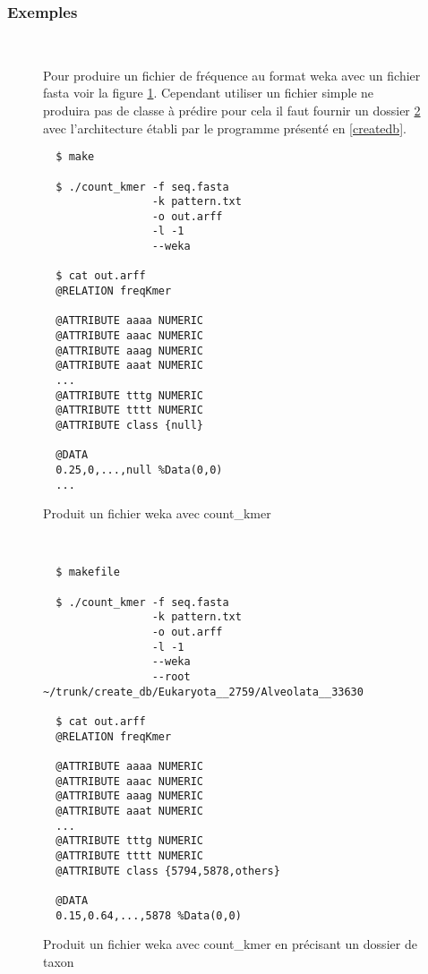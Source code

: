 \subsubsection{Exemples}


~\\
\begin{figure}[H]

Pour produire un fichier de fréquence au format weka avec un fichier fasta voir la figure \ref{freq1}.
Cependant utiliser un fichier simple ne produira pas de classe à prédire pour cela il faut fournir un dossier \ref{freq2}
avec l'architecture établi par le programme présenté en \ref{createdb}.
\begin{center}
\begin{verbatim}
  $ make
  
  $ ./count_kmer -f seq.fasta 
                 -k pattern.txt 
                 -o out.arff 
                 -l -1 
                 --weka
  
  $ cat out.arff
  @RELATION freqKmer

  @ATTRIBUTE aaaa NUMERIC
  @ATTRIBUTE aaac NUMERIC
  @ATTRIBUTE aaag NUMERIC
  @ATTRIBUTE aaat NUMERIC
  ...
  @ATTRIBUTE tttg NUMERIC
  @ATTRIBUTE tttt NUMERIC
  @ATTRIBUTE class {null}

  @DATA
  0.25,0,...,null %Data(0,0)
  ...

  \end{verbatim}
\end{center}
\caption{\label{freq1}Produit un fichier weka avec count\_kmer}
\end{figure}

~\\
\begin{figure}[H]
\begin{center}
\begin{verbatim}
  $ makefile
  
  $ ./count_kmer -f seq.fasta 
                 -k pattern.txt 
                 -o out.arff 
                 -l -1 
                 --weka 
                 --root ~/trunk/create_db/Eukaryota__2759/Alveolata__33630
  
  $ cat out.arff
  @RELATION freqKmer

  @ATTRIBUTE aaaa NUMERIC
  @ATTRIBUTE aaac NUMERIC
  @ATTRIBUTE aaag NUMERIC
  @ATTRIBUTE aaat NUMERIC
  ...
  @ATTRIBUTE tttg NUMERIC
  @ATTRIBUTE tttt NUMERIC
  @ATTRIBUTE class {5794,5878,others}

  @DATA
  0.15,0.64,...,5878 %Data(0,0)

  \end{verbatim}
\end{center}
\caption{\label{freq2}Produit un fichier weka avec count\_kmer en précisant un dossier de taxon}
\end{figure}
~\\
